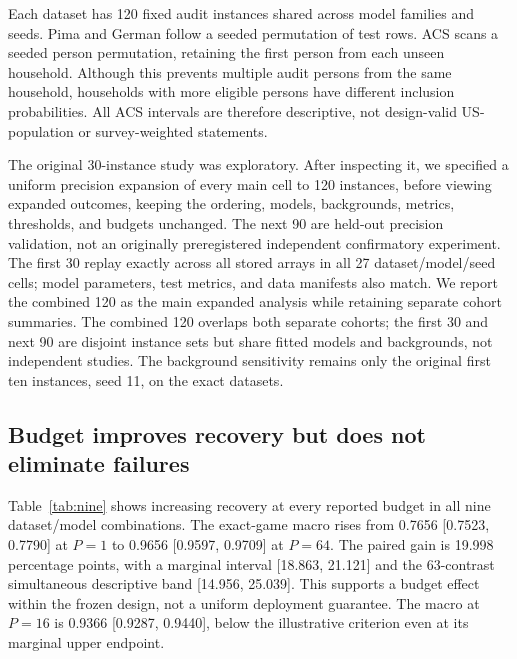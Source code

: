 \documentclass{article}
\DeclareRobustCommand{\artifact}[1]{\path{#1}}
\begin{document}
Each dataset has 120 fixed audit instances shared across model families and seeds. Pima and German follow a seeded permutation of test rows. ACS scans a seeded person permutation, retaining the first person from each unseen household. Although this prevents multiple audit persons from the same household, households with more eligible persons have different inclusion probabilities. All ACS intervals are therefore descriptive, not design-valid US-population or survey-weighted statements.

The original 30-instance study was exploratory. After inspecting it, we specified a uniform precision expansion of every main cell to 120 instances, before viewing expanded outcomes, keeping the ordering, models, backgrounds, metrics, thresholds, and budgets unchanged. The next 90 are held-out precision validation, not an originally preregistered independent confirmatory experiment. The first 30 replay exactly across all stored arrays in all 27 dataset/model/seed cells; model parameters, test metrics, and data manifests also match. We report the combined 120 as the main expanded analysis while retaining separate cohort summaries. The combined 120 overlaps both separate cohorts; the first 30 and next 90 are disjoint instance sets but share fitted models and backgrounds, not independent studies. The background sensitivity remains only the original first ten instances, seed 11, on the exact datasets.

\subsection{Budget improves recovery but does not eliminate failures}
\begin{table}[t]
\caption{Single-run antithetic top-three set recovery $\uparrow$ for the combined 120-instance audit. Entries are means and marginal descriptive 95\% paired instance-cluster intervals, with runs and fixed seeds averaged within instance. \textbf{German rows measure agreement with an approximate reference, not true accuracy.} Source: \artifact{analysis120/paper_antithetic_9cells.tex} and matching CSV.}
\label{tab:nine}
\centering
\resizebox{\textwidth}{!}{}
\end{table}

Table~\ref{tab:nine} shows increasing recovery at every reported budget in all nine dataset/model combinations. The exact-game macro rises from 0.7656 [0.7523, 0.7790] at $P=1$ to 0.9656 [0.9597, 0.9709] at $P=64$. The paired gain is 19.998 percentage points, with a marginal interval [18.863, 21.121] and the 63-contrast simultaneous descriptive band [14.956, 25.039]. This supports a budget effect within the frozen design, not a uniform deployment guarantee. The macro at $P=16$ is 0.9366 [0.9287, 0.9440], below the illustrative criterion even at its marginal upper endpoint.
\end{document}
